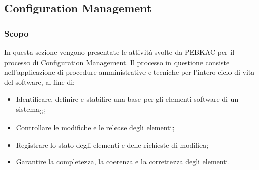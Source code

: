 \subsection{Configuration Management}
\subsubsection{Scopo}
In questa sezione vengono presentate le attività svolte da PEBKAC per il processo di Configuration Management. Il processo in questione consiste nell'applicazione di procedure amministrative e tecniche per l'intero ciclo di vita del software, al fine di:
\begin{itemize}
    \item Identificare, definire e stabilire una base per gli elementi software di un sistema\textsubscript{G};
    \item Controllare le modifiche e le release degli elementi;
    \item Registrare lo stato degli elementi e delle richieste di modifica;
    \item Garantire la completezza, la coerenza e la correttezza degli elementi.
\end{itemize}
